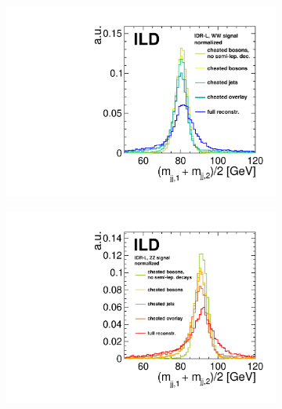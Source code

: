 \begin{figure}[htbp]
\begin{center}
\begin{subfigure}{0.495\hsize} \includegraphics[width=\textwidth]{Performance/fig/l_WW_cheating_steps.pdf}
 \caption{ \label{fig:qgc:cheat:WW}}
 \end{subfigure}
\begin{subfigure}{0.495\hsize} \includegraphics[width=\textwidth]{Performance/fig/l_ZZ_cheating_steps.pdf}
 \caption{  \label{fig:qgc:cheat:ZZ}}
 \end{subfigure}

\end{center}
\end{figure}
